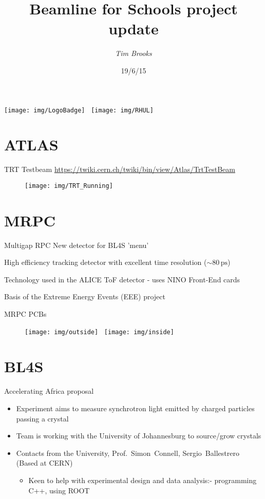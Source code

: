 \documentclass{beamer}
\title[Beamline for Schools\hspace{2em}\insertframenumber/
\inserttotalframenumber]{Beamline for Schools project update}
\author{\emph{Tim Brooks}}
\institute{CERN}
\date{19/6/15}
\begin{document}
\begin{frame}
\titlepage{}
\centering
\texttt{[image: img/LogoBadge]}
\,
\texttt{[image: img/RHUL]}
\end{frame}

\section{ATLAS}
\begin{frame}{TRT Testbeam}
\href{https://twiki.cern.ch/twiki/bin/view/Atlas/TrtTestBeam}{https://twiki.cern.ch/twiki/bin/view/Atlas/TrtTestBeam}
  \begin{figure}
    \centering
    \texttt{[image: img/TRT\_Running]}
  \end{figure}
\end{frame}

\section{MRPC}
\begin{frame}{Multigap RPC}
New detector for BL4S 'menu'

High efficiency tracking detector with excellent time resolution ($\sim80\,\text{ps}$)

Technology used in the ALICE ToF detector - uses NINO Front-End cards

Basis of the Extreme Energy Events (EEE) project
\end{frame}

\begin{frame}{MRPC PCBs}
  \begin{figure}
    \centering
    \texttt{[image: img/outside]}
    \,
    \texttt{[image: img/inside]}
  \end{figure}
\end{frame}

\section{BL4S}

\begin{frame}{Accelerating Africa proposal}
\begin{itemize}
\item Experiment aims to measure synchrotron light emitted by charged particles passing a crystal

\item Team is working with the University of Johannesburg to source/grow crystals

\item Contacts from the University, Prof.~Simon~Connell, Sergio~Ballestrero (Based at CERN)
\begin{itemize}\item Keen to help with experimental design and data analysis:- programming C++, using ROOT
\end{itemize}
\end{itemize}
\end{frame}
\end{document}
